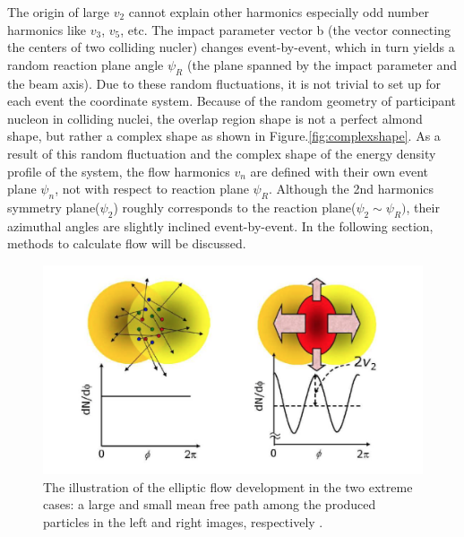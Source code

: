 	The origin of large $v_2$ cannot explain other harmonics especially odd number harmonics like $v_3$, $v_5$, etc. The impact parameter vector b (the vector connecting the centers of two colliding nucler) changes event-by-event, which in turn yields a random reaction plane angle $\psi_R$ (the plane spanned by the impact parameter and the beam axis). Due to these random fluctuations, it is not trivial to set up for each event the coordinate system. Because of the random geometry of participant nucleon in colliding nuclei, the overlap region shape is not a perfect almond shape, but rather a complex shape as shown in Figure.\ref{fig:complexshape}. As a result of this random fluctuation and the complex shape of the energy density profile of the system, the flow harmonics $v_n$ are defined with their own event plane $\psi_n$, not with respect to reaction plane $\psi_R$. Although the 2nd harmonics symmetry plane($\psi_2$) roughly corresponds to the reaction plane($\psi_2 \sim \psi_R)$, their azimuthal angles are slightly inclined event-by-event. In the following section, methods to calculate flow will be discussed.
		

\begin{figure}[h]
\centerline{\includegraphics[width=13.0cm]{figures/v2explin}}
\caption{The illustration of the elliptic flow development in the two extreme cases: a large and small mean free path among the produced particles in the left and right images, respectively \cite{Voloshin:2008dg}.}
\label{fig5}
\end{figure}

